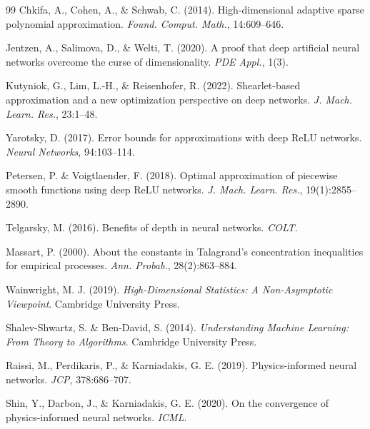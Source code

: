 \documentclass[12pt,a4paper]{article}
\begin{document}
\begin{thebibliography}{99}
     Chkifa, A., Cohen, A., \& Schwab, C. (2014). High-dimensional adaptive sparse polynomial approximation. \textit{Found. Comput. Math.}, 14:609--646.

     Jentzen, A., Salimova, D., \& Welti, T. (2020). A proof that deep artificial neural networks overcome the curse of dimensionality. \textit{PDE Appl.}, 1(3).

     Kutyniok, G., Lim, L.-H., \& Reisenhofer, R. (2022). Shearlet-based approximation and a new optimization perspective on deep networks. \textit{J. Mach. Learn. Res.}, 23:1--48.

     Yarotsky, D. (2017). Error bounds for approximations with deep ReLU networks. \textit{Neural Networks}, 94:103--114.

     Petersen, P. \& Voigtlaender, F. (2018). Optimal approximation of piecewise smooth functions using deep ReLU networks. \textit{J. Mach. Learn. Res.}, 19(1):2855--2890.

     Telgarsky, M. (2016). Benefits of depth in neural networks. \textit{COLT}.

     Massart, P. (2000). About the constants in Talagrand's concentration inequalities for empirical processes. \textit{Ann. Probab.}, 28(2):863--884.

     Wainwright, M. J. (2019). \textit{High-Dimensional Statistics: A Non-Asymptotic Viewpoint}. Cambridge University Press.

     Shalev-Shwartz, S. \& Ben-David, S. (2014). \textit{Understanding Machine Learning: From Theory to Algorithms}. Cambridge University Press.

     Raissi, M., Perdikaris, P., \& Karniadakis, G. E. (2019). Physics-informed neural networks. \textit{JCP}, 378:686--707.

     Shin, Y., Darbon, J., \& Karniadakis, G. E. (2020). On the convergence of physics-informed neural networks. \textit{ICML}.


\end{thebibliography}
\end{document}

